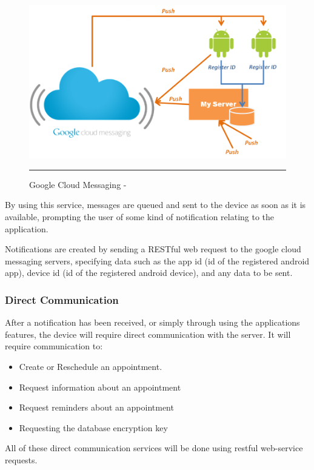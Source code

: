 \begin{figure}[htbp]
	\centering
\includegraphics[width=\textwidth,height=\textheight,keepaspectratio]{Figures/gcm.png}
		\rule{35em}{0.5pt}
	\caption[Google Cloud Messaging - \cite{gcm}]{Google Cloud Messaging - \cite{gcm}}
	\label{fig:gcm}
\end{figure}

By using this service, messages are queued and sent to the device as soon as it is available, prompting the user of some kind of notification relating to the application.

Notifications are created by sending a RESTful web request to the google cloud messaging servers, specifying data such as the app id (id of the registered android app), device id (id of the registered android device), and any data to be sent.

\subsubsection{Direct Communication}

After a notification has been received, or simply through using the applications features, the device will require direct communication with the server. It will require communication to:

\begin{itemize}
	\item Create or Reschedule an appointment.
	\item Request information about an appointment
	\item Request reminders about an appointment
	\item Requesting the database encryption key
\end{itemize}

All of these direct communication services will be done using restful web-service requests.

